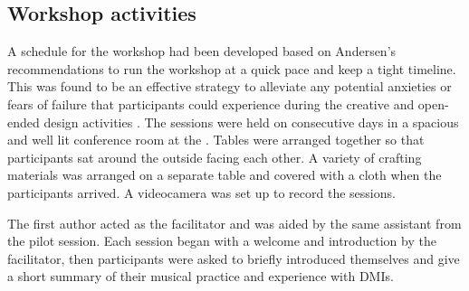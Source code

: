 \documentclass[letterpaper, 12pt]{article}
\begin{document}
\subsection{Workshop activities}
\label{sec:workshop-activities}

A schedule for the workshop had been developed based on Andersen's recommendations to run the workshop at a quick pace and keep a tight timeline. This was found to be an effective strategy to alleviate any potential anxieties or fears of failure that participants could experience during the creative and open-ended design activities \citep{Andersen2017}. The sessions were held on consecutive days in a spacious and well lit conference room at the . Tables were arranged together so that participants sat around the outside facing each other. A variety of crafting materials was  arranged on a separate table and covered with a cloth when the participants arrived. A videocamera was set up to record the sessions.

The first author acted as the facilitator and was aided by the same assistant from the pilot session. Each session began with a welcome and introduction by the facilitator, then participants were asked to briefly introduced themselves and give a short summary of their musical practice and experience with DMIs. 




\end{document}
